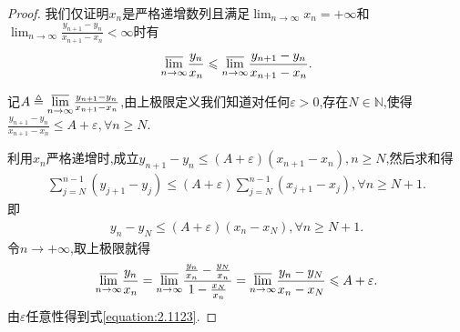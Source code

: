 \documentclass[../../main.tex]{subfiles}%
\begin{document}
\begin{proof}
我们仅证明\(x_n\)是严格递增数列且满足\(\lim_{n \to \infty} x_n = +\infty\)和\(\lim_{n \to \infty} \frac{y_{n + 1} - y_n}{x_{n + 1} - x_n} < \infty\)时有
\begin{align}\label{equation:2.1123}
\underset{n\rightarrow \infty}{{\varlimsup }} \frac{y_n}{x_n} \leqslant \underset{n\rightarrow \infty}{{\varlimsup }} \frac{y_{n + 1} - y_n}{x_{n + 1} - x_n}.
\end{align}

记\(A \triangleq \underset{n\rightarrow \infty}{{\varlimsup }} \frac{y_{n + 1} - y_n}{x_{n + 1} - x_n}\),由上极限定义我们知道对任何\(\varepsilon > 0\),存在\(N \in \mathbb{N}\),使得
\(\frac{y_{n + 1} - y_n}{x_{n + 1} - x_n} \leqslant A + \varepsilon, \forall n \geqslant N\).

利用\(x_n\)严格递增时,成立\(y_{n + 1} - y_n \leqslant (A + \varepsilon)(x_{n + 1} - x_n), n \geqslant N\),然后求和得
\begin{align*}
\sum\limits_{j = N}^{n - 1} (y_{j + 1} - y_j) \leqslant (A + \varepsilon) \sum\limits_{j = N}^{n - 1} (x_{j + 1} - x_j), \forall n \geqslant N + 1.
\end{align*}
即
\begin{align*}
y_n - y_N \leqslant (A + \varepsilon)(x_n - x_N), \forall n \geqslant N + 1.
\end{align*}
令$n\to+\infty$,取上极限就得
\begin{align*}
\underset{n\rightarrow \infty}{{\varlimsup }} \frac{y_n}{x_n} = \underset{n\rightarrow \infty}{{\varlimsup }} \frac{\frac{y_n}{x_n} - \frac{y_N}{x_n}}{1 - \frac{x_N}{x_n}} = \underset{n\rightarrow \infty}{{\varlimsup }} \frac{y_n - y_N}{x_n - x_N} \leqslant A + \varepsilon.
\end{align*}
由\(\varepsilon\)任意性得到式\eqref{equation:2.1123}.
\end{proof}
\end{document}

